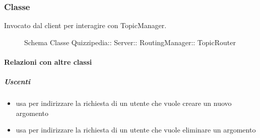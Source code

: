 \subsubsection{Classe }
Invocato dal client per interagire con TopicManager.
\begin{figure}[H]
\centering
\noindent{}
\caption[Schema Classe TopicRouter]{Schema Classe Quizzipedia:: Server:: RoutingManager:: TopicRouter}
\end{figure}
\paragraph{Relazioni con altre classi}
\subparagraph{Uscenti}
\begin{itemize}
\item usa  per indirizzare la richiesta di un utente che vuole creare un nuovo argomento
\item usa  per indirizzare la richiesta di un utente che vuole eliminare un argomento
\end{itemize}
